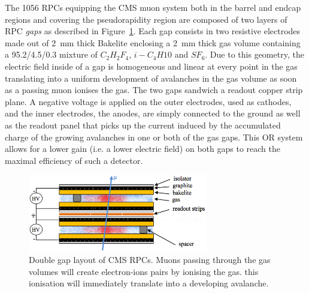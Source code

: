 	The 1056 RPCs equipping the CMS muon system both in the barrel and endcap regions and covering the pseudorapidity region  are composed of two layers of RPC \textit{gaps} as described in Figure~\ref{fig:RPC-DG-layout}. Each gap consists in two resistive electrodes made out of \SI{2}{mm} thick Bakelite enclosing a \SI{2}{mm} thick gas volume containing a 95.2/4.5/0.3 mixture of $C_2H_2F_4$, $i-C_4H10$ and $SF_6$. Due to this geometry, the electric field inside of a gap is homogeneous and linear at every point in the gas translating into a uniform development of avalanches in the gas volume as soon as a passing muon ionises the gas. The two gaps sandwich a readout copper strip plane. A negative voltage is applied on the outer electrodes, used as cathodes, and the inner electrodes, the anodes, are simply connected to the ground as well as the readout panel that picks up the current induced by the accumulated charge of the growing avalanches in one or both of the gas gaps. This OR system allows for a lower gain (i.e. a lower electric field) on both gaps to reach the maximal efficiency of such a detector.
	
	\begin{figure}[H]
		\centering
		\includegraphics[width=0.7\textwidth]{fig/chapt2/RPC_DG_layout.png}
		\caption{\label{fig:RPC-DG-layout} Double gap layout of CMS RPCs. Muons passing through the gas volumes will create electron-ions pairs by ionising the gas. this ionisation will immediately translate into a developing avalanche.}
	\end{figure}

\clearpage{\pagestyle{empty}\cleardoublepage}
